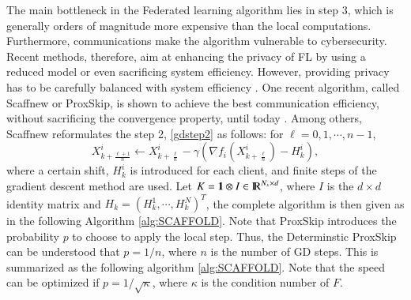 \documentclass{article}
\newcommand{\Reals}[1]{{\rm I\! R}^{#1}}
\theoremstyle{definition}
\begin{document}
The main bottleneck in the Federated learning algorithm lies in step 3, which is generally orders of magnitude more expensive than the local computations. Furthermore, communications make the algorithm vulnerable to cybersecurity. Recent methods, therefore, aim at enhancing the privacy of FL by using a reduced model or even sacrificing system efficiency. However, providing privacy has to be carefully balanced with system efficiency \cite{li2020federated}. One recent algorithm, called Scaffnew or ProxSkip, is shown to achieve the best communication efficiency, without sacrificing the convergence property, until today \cite{mishchenko2022proxskip}. Among others, Scaffnew reformulates the step 2, \eqref{gdstep2} as follows: for $\ell = 0, 1,\cdots, n-1$, 
\begin{equation}\label{main:scaffnew}
X_{k+\frac{\ell+1}{n}}^i \leftarrow X_{k+\frac{\ell}{n}}^i - \gamma \left (\nabla f_i \left ( X_{k+\frac{\ell}{n}}^i \right ) - H_k^i \right ),   
\end{equation} 
where a certain shift, $H_k^i$ is introduced for each client, and finite steps of the gradient descent method are used. Let $K = {\textbf{1}} \otimes I \in \Reals{N_x \times d}$, where $I$ is the $d\times d$ identity matrix and $H_k = (H_k^1,\cdots,H_k^{N})^T$, the complete algorithm is then given as in the following Algorithm \ref{alg:SCAFFOLD}. Note that ProxSkip introduces the probability $p$ to choose to apply the local step. Thus, the Determinstic ProxSkip can be understood that $p = 1/n$, where $n$ is the number of GD steps. This is summarized as the following algorithm \ref{alg:SCAFFOLD}. Note that the speed can be optimized if $p = 1/\sqrt{\kappa}$, where $\kappa$ is the condition number of $F$. 
\end{document}
